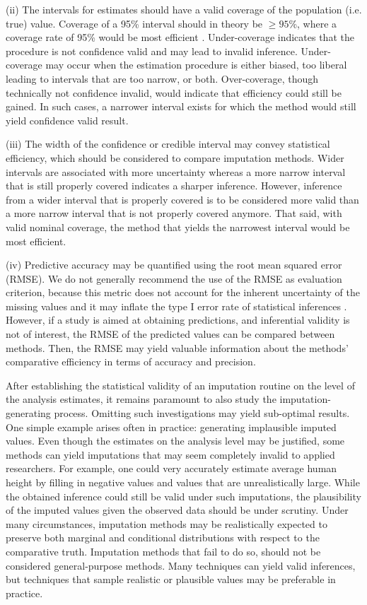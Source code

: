 \documentclass[bimj,fleqn]{w-art}
\begin{document}
(ii) The intervals for estimates should have a valid coverage of the population (i.e. true) value. Coverage of a 95\% interval should in theory be $\geq 95$\%, where a coverage rate of 95\% would be most efficient \citep[p. 589]{neym34}. Under-coverage indicates that the procedure is not confidence valid and may lead to invalid inference. Under-coverage may occur when the estimation procedure is either biased, too liberal leading to intervals that are too narrow, or both. Over-coverage, though technically not confidence invalid, would indicate that efficiency could still be gained. In such cases, a narrower interval exists for which the method would still yield confidence valid result. 

(iii) The width of the confidence or credible interval may convey statistical efficiency, which should be considered to compare imputation methods. Wider intervals are associated with more uncertainty whereas a more narrow interval that is still properly covered indicates a sharper inference. However, inference from a wider interval that is properly covered is to be considered more valid than a more narrow interval that is not properly covered anymore. That said, with valid nominal coverage, the method that yields the narrowest interval would be most efficient. 

(iv) Predictive accuracy may be quantified using the root mean squared error (RMSE). We do not generally recommend the use of the RMSE as evaluation criterion, because this metric does not account for the inherent uncertainty of the missing values and it may inflate the type I error rate of statistical inferences \citep[Chapter 2.6][]{buur18}. However, if a study is aimed at obtaining predictions, and inferential validity is not of interest, the RMSE of the predicted values can be compared between methods. Then, the RMSE may yield valuable information about the methods' comparative efficiency in terms of accuracy and precision. 

After establishing the statistical validity of an imputation routine on the level of the analysis estimates, it remains paramount to also study the imputation-generating process. Omitting such investigations may yield sub-optimal results. One simple example arises often in practice: generating implausible imputed values. Even though the estimates on the analysis level may be justified, some methods can yield imputations that may seem completely invalid to applied researchers. For example, one could very accurately estimate average human height by filling in negative values and values that are unrealistically large. While the obtained inference could still be valid under such imputations, the plausibility of the imputed values given the observed data should be under scrutiny. Under many circumstances, imputation methods may be realistically expected to preserve both marginal and conditional distributions with respect to the comparative truth. Imputation methods that fail to do so, should not be considered general-purpose methods. Many techniques can yield valid inferences, but techniques that sample realistic or plausible values may be preferable in practice. 
\end{document}
